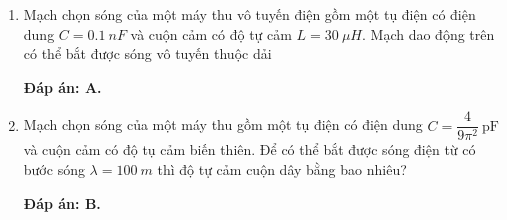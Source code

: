 \begin{enumerate}[label=\bfseries Câu \arabic*:]
{		
	}
		\item {} 
	
	{Mạch chọn sóng của một máy thu vô tuyến điện gồm một tụ điện có điện dung $C = \SI{0,1}{nF}$ và cuộn cảm có độ tự cảm $L = \SI{30}{\mu H}$.  Mạch dao động trên có thể bắt được sóng vô tuyến thuộc dải
	}
	
	\hideall
	{		\textbf{Đáp án: A.}
		
		
	}
		\item {} 
	
	{Mạch chọn sóng của một máy thu gồm một tụ điện có điện dung $C= \dfrac{4}{9\pi^2}\ \text{pF}$ và cuộn cảm có độ tụ cảm biến thiên. Để có thể bắt được sóng điện từ có bước sóng $\lambda = \SI{100}{m}$ thì độ tự cảm cuộn dây bằng bao nhiêu?
		
	}
	
	\hideall
	{		\textbf{Đáp án: B.}
		
		
	}
\end{enumerate}

